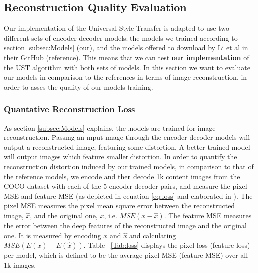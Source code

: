 \subsection{Reconstruction Quality Evaluation}

Our implementation of the Universal Style Transfer is adapted to use two different sets of encoder-decoder models: the models we trained according to section \ref{subsec:Models} (our), and the models offered to download by Li et al in their GitHub (reference). This means that we can test \textbf{our implementation} of the UST algorithm with both sets of models. In this section we want to evaluate our models in comparison to the references in terms of image reconstruction, in order to asses the quality of our models training.

\subsubsection{Quantative Reconstruction Loss}
As section \ref{subsec:Models} explains, the models are trained for image reconstruction. Passing an input image through the encoder-decoder models will output a reconstructed image, featuring some distortion. A better trained model will output images which feature smaller distortion. In order to quantify the reconstruction distortion induced by our trained models, in comparison to that of the reference models, we encode and then decode 1k content images from the COCO dataset with each of the 5 encoder-decoder pairs, and measure the pixel MSE and feature MSE (as depicted in equation \ref{eq:loss} and elaborated in \cite{bib22, bib17}). The pixel MSE measures the pixel mean square error between the reconstructed image, $\hat{x}$, and the original one, $x$, i.e. $MSE(x - \hat{x})$. The feature MSE measures the error between the deep features of the reconstructed image and the original one. It is measured by encoding $x$ and $\hat{x}$ and calculating $MSE(E(x)-E(\hat{x}))$. Table ~\ref{Tab:loss} displays the pixel loss (feature loss) per model, which is defined to be the average pixel MSE (feature MSE) over all 1k images.
 

